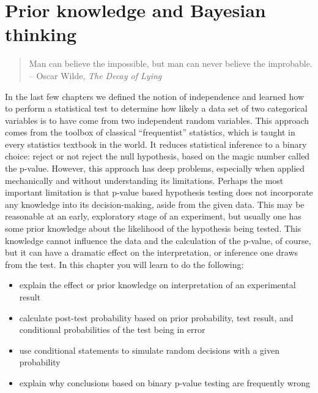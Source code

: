 \documentclass[
]{book}
\providecommand{\tightlist}{%
  \setlength{\itemsep}{0pt}\setlength{\parskip}{0pt}}
\theoremstyle{definition}
\theoremstyle{definition}
\theoremstyle{definition}
\theoremstyle{remark}
\begin{document}
\hypertarget{prior-knowledge-and-bayesian-thinking}{%
\chapter{Prior knowledge and Bayesian thinking}\label{prior-knowledge-and-bayesian-thinking}}

\begin{quote}
Man can believe the impossible, but man can never believe the improbable.\\
-- Oscar Wilde, \emph{The Decay of Lying}
\end{quote}

In the last few chapters we defined the notion of independence and learned how to perform a statistical test to determine how likely a data set of two categorical variables is to have come from two independent random variables. This approach comes from the toolbox of classical ``frequentist'' statistics, which is taught in every statistics textbook in the world. It reduces statistical inference to a binary choice: reject or not reject the null hypothesis, based on the magic number called the p-value. However, this approach has deep problems, especially when applied mechanically and without understanding its limitations. Perhaps the most important limitation is that p-value based hypothesis testing does not incorporate any knowledge into its decision-making, aside from the given data. This may be reasonable at an early, exploratory stage of an experiment, but usually one has some prior knowledge about the likelihood of the hypothesis being tested. This knowledge cannot influence the data and the calculation of the p-value, of course, but it can have a dramatic effect on the interpretation, or inference one draws from the test. In this chapter you will learn to do the following:

\begin{itemize}
\tightlist
\item
  explain the effect or prior knowledge on interpretation of an experimental result
\item
  calculate post-test probability based on prior probability, test result, and conditional probabilities of the test being in error
\item
  use conditional statements to simulate random decisions with a given probability
\item
  explain why conclusions based on binary p-value testing are frequently wrong
\end{itemize}
\end{document}
